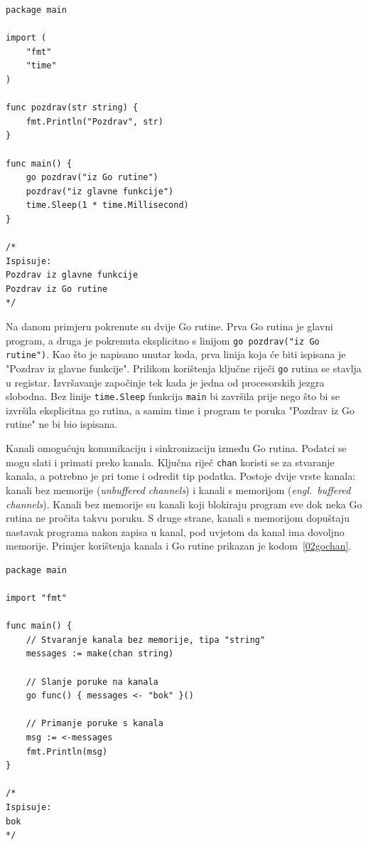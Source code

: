 \begin{lstlisting}[float=h]
package main

import (
    "fmt"
    "time"
)

func pozdrav(str string) {
    fmt.Println("Pozdrav", str)
}

func main() {
    go pozdrav("iz Go rutine")
    pozdrav("iz glavne funkcije")
    time.Sleep(1 * time.Millisecond)
}

/*
Ispisuje:
Pozdrav iz glavne funkcije
Pozdrav iz Go rutine
*/
\end{lstlisting}

Na danom primjeru pokrenute su dvije Go rutine. Prva Go rutina je glavni program, a druga je
pokrenuta eksplicitno s linijom \texttt{go pozdrav("iz Go rutine")}. Kao što je napisano unutar
koda, prva linija koja će biti ispisana je "Pozdrav iz glavne funkcije". Prilikom korištenja ključne
riječi \texttt{go} rutina se stavlja u registar. Izvršavanje započinje tek kada je jedna od
procesorskih jezgra slobodna. Bez linije \texttt{time.Sleep} funkcija \texttt{main} bi završila
prije nego što bi se izvršila eksplicitna go rutina, a samim time i program te poruka "Pozdrav iz Go
rutine" ne bi bio ispisana.

Kanali omogućuju komunikaciju i sinkronizaciju između Go rutina. Podatci se mogu slati i primati
preko kanala. Ključna riječ \texttt{chan} koristi se za stvaranje kanala, a potrebno je pri tome i
odredit tip podatka. Postoje dvije vrste kanala: kanali bez memorije (\textit{unbuffered channels})
i kanali s memorijom (\textit{engl.~buffered channels}). Kanali bez memorije su kanali koji
blokiraju program sve dok neka Go rutina ne pročita takvu poruku. S druge strane, kanali s memorijom
dopuštaju nastavak programa nakon zapisa u kanal, pod uvjetom da kanal ima dovoljno memorije.
Primjer korištenja kanala i Go rutine prikazan je kodom~\ref{02gochan}.

\begin{lstlisting}[float=h]
package main

import "fmt"

func main() {
    // Stvaranje kanala bez memorije, tipa "string"
    messages := make(chan string)

    // Slanje poruke na kanala
    go func() { messages <- "bok" }()

    // Primanje poruke s kanala
    msg := <-messages
    fmt.Println(msg)
}

/*
Ispisuje:
bok
*/
\end{lstlisting}


